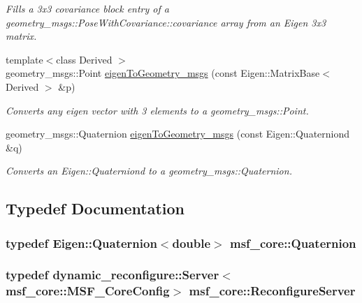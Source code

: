 \begin{DoxyCompactItemize}
\begin{DoxyCompactList}\small\item\em Fills a 3x3 covariance block entry of a geometry\-\_\-msgs\-::\-Pose\-With\-Covariance\-::covariance array from an Eigen 3x3 matrix. \end{DoxyCompactList}\item 
{\footnotesize template$<$class Derived $>$ }\\geometry\-\_\-msgs\-::\-Point \hyperlink{namespacemsf__core_ae9e9826a3cf9d0a0d29cb0d3b2c2f37c}{eigen\-To\-Geometry\-\_\-msgs} (const Eigen\-::\-Matrix\-Base$<$ Derived $>$ \&p)
\begin{DoxyCompactList}\small\item\em Converts any eigen vector with 3 elements to a geometry\-\_\-msgs\-::\-Point. \end{DoxyCompactList}\item 
geometry\-\_\-msgs\-::\-Quaternion \hyperlink{namespacemsf__core_aa2c20e862db8f30eb976ba797bacff2c}{eigen\-To\-Geometry\-\_\-msgs} (const Eigen\-::\-Quaterniond \&q)
\begin{DoxyCompactList}\small\item\em Converts an Eigen\-::\-Quaterniond to a geometry\-\_\-msgs\-::\-Quaternion. \end{DoxyCompactList}\end{DoxyCompactItemize}


\subsection{Typedef Documentation}
\hypertarget{namespacemsf__core_a044c525dd7800e2e2f4bb86fc565a7c7}{
\subsubsection[{Quaternion}]{\setlength{\rightskip}{0pt plus 5cm}typedef Eigen\-::\-Quaternion$<$double$>$ {\bf msf\-\_\-core\-::\-Quaternion}}}\label{namespacemsf__core_a044c525dd7800e2e2f4bb86fc565a7c7}
\hypertarget{namespacemsf__core_a1f60c4e359e82d9ad14dd135769ccc1a}{
\subsubsection[{Reconfigure\-Server}]{\setlength{\rightskip}{0pt plus 5cm}typedef dynamic\-\_\-reconfigure\-::\-Server$<$msf\-\_\-core\-::\-M\-S\-F\-\_\-\-Core\-Config$>$ {\bf msf\-\_\-core\-::\-Reconfigure\-Server}}}\label{namespacemsf__core_a1f60c4e359e82d9ad14dd135769ccc1a}


